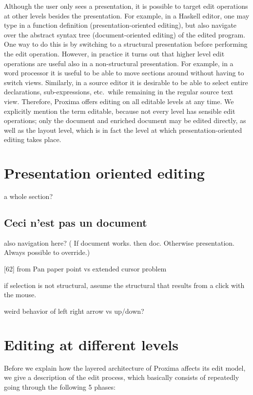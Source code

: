 Although the user only sees a presentation, it is possible to target edit operations at other levels besides the presentation. For example, in a Haskell editor, one may type in a function definition (presentation-oriented editing), but also navigate over the abstract syntax tree (document-oriented editing) of the edited program. One way to do this is by switching to a structural presentation before performing the edit operation. However, in practice it turns out that higher level edit operations are useful also in a non-structural presentation. For example, in a word processor it is useful to be able to move sections around without having to switch views. Similarly, in a source editor it is desirable to be able to select entire declarations, sub-expressions, etc.\ while remaining in the regular source text view. Therefore, Proxima offers editing on all editable levels at any time. We explicitly mention the term editable, because not every level has sensible edit operations; only the document and enriched document may be edited directly, as well as the layout level, which is in fact the level at which presentation-oriented editing takes place.

\bc
\section{Presentation oriented editing}
a whole section?

\subsection{Ceci n'est pas un document}

also navigation here? ( If document works. then doc. Otherwise presentation. Always  possible to override.)

[62] from Pan paper point vs extended cursor problem

if selection is not structural, assume the structural that results from a click with the mouse.

weird behavior of left right arrow vs up/down? 
\ec


%																
%																
%																
\section{Editing at different levels} \label{sect:editDifferentLevels}

Before we explain how the layered architecture of Proxima affects its edit model, we give a description of the edit process, which basically consists of repeatedly going through the following 5 phases:

